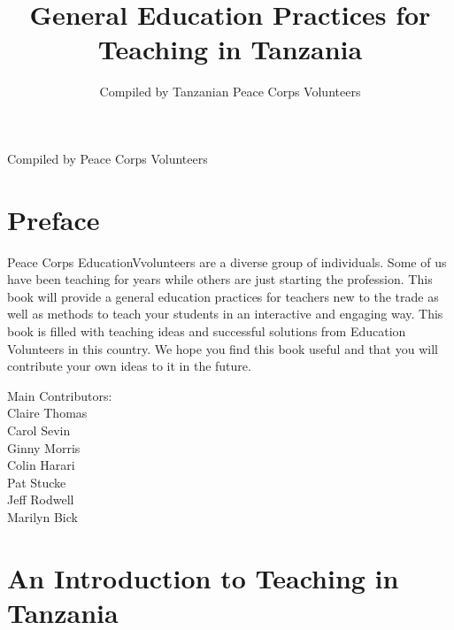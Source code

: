 \documentclass[12pt,a4paper]{book}
\author{Compiled by Tanzanian Peace Corps Volunteers}
\title{General Education Practices for Teaching in Tanzania}
\begin{document}
\begin{titlepage}
\begin{center}
\vspace{1in}


\setlength\fboxsep{0pt}
\setlength\fboxrule{2pt}
\end{center}

\vfill
\begin{center}
\begin{Large}
Compiled by Peace Corps Volunteers\\
\end{Large}
\end{center}

\end{titlepage}

\tableofcontents

\chapter*{Preface}
Peace Corps EducationVvolunteers are a diverse group of individuals.  Some of us have been teaching for years while others are just starting the profession.  This book will provide a general education practices for teachers new to the trade as well as methods to teach your students in an interactive and engaging way.  This book is filled with teaching ideas and successful solutions from Education Volunteers in this country.   We hope you find this book useful and that you will contribute your own ideas to it in the future.

\vfill
\begin{center}
Main Contributors:\\
Claire Thomas\\
Carol Sevin\\
Ginny Morris\\
Colin Harari\\ 
Pat Stucke\\
Jeff Rodwell\\
Marilyn Bick\\
\end{center}


\chapter{An Introduction to Teaching in Tanzania}

\end{document}

